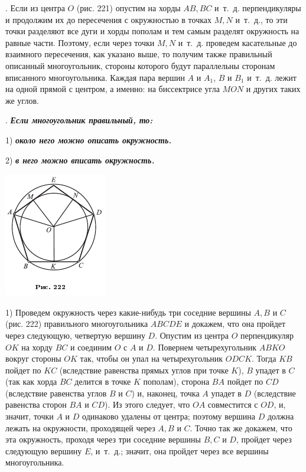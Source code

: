 \documentclass[oneside]{book}
\begin{document}
.
Если из центра $O$ (рис. 221) опустим на хорды $AB, BC$ и~т.~д.
перпендикуляры и продолжим их до пересечения с окружностью в точках $M, N$ и~т.~д., то эти точки разделяют все дуги и хорды пополам и тем самым разделят окружность на равные части.
Поэтому, если через точки $M, N$ и~т.~д.
проведем касательные до взаимного пересечения, как указано выше, то получим также правильный описанный многоугольник, стороны которого будут параллельны сторонам вписанного многоугольника.
Каждая пара вершин $A$ и $A_1$, $B$ и $B_1$ и~т.~д.
лежит на одной прямой с центром, а именно:
на биссектрисе угла $MON$ и других таких же углов.

.
\textbf{\emph{Если многоугольник правильный, то:}}

1) \textbf{\emph{около него можно описать окружность.}}

2) \textbf{\emph{в него можно вписать окружность.}}

\includegraphics{pics/ris-222}

1) Проведем окружность через какие-нибудь три соседние вершины $A, B$ и $C$ (рис. 222) правильного многоугольника $ABCDE$ и докажем, что она пройдет через следующую, четвертую вершину $D$.
Опустим из центра $O$ перпендикуляр $OK$ на хорду $BC$ и соединим $O$ с $A$ и $D$.
Повернем четырехугольник $ABKO$ вокруг стороны $OK$ так, чтобы он упал на четырехугольник $ODCK$.
Тогда $KB$ пойдет по $KC$ (вследствие равенства прямых углов при точке $K$), 
$B$ упадет в $C$ (так как хорда $BC$ делится в точке $K$ пополам), 
сторона $BA$ пойдет по $CD$ (вследствие равенства углов $B$ и $C$)
и, наконец, точка $A$ упадет в $D$ (вследствие равенства сторон $BA$ и $CD$).
Из этого следует, что $OA$ совместится с $OD$, и, значит, точки $A$ и $D$ одинаково удалены от центра;
поэтому вершина $D$ должна лежать на окружности, проходящей через $A, B$ и $C$.
Точно так же докажем, что эта окружность, проходя через три соседние вершины $B, C$ и $D$, пройдет через следующую вершину $E$, и~т.~д.;
значит, она пройдет через все вершины многоугольника.
\end{document}
